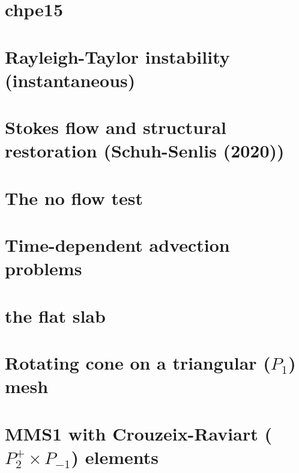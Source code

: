\documentclass[a4paper,11pt]{report}
\begin{document}
\chapter{chpe15 \label{f39}}

\chapter{Rayleigh-Taylor instability (instantaneous) \label{f40}} 

\chapter{Stokes flow and structural restoration (Schuh-Senlis \etal (2020))\label{f41}} 

\chapter{The no flow test \label{f42}} 

\chapter{Time-dependent advection problems\label{f43}} 

\chapter{the flat slab \label{f44}} 

\chapter{Rotating cone on a triangular ($P_1$) mesh\label{f45}} 

\chapter{MMS1 with Crouzeix-Raviart ($P_2^+\times P_{-1}$) elements  \label{f46}} 
\end{document}
